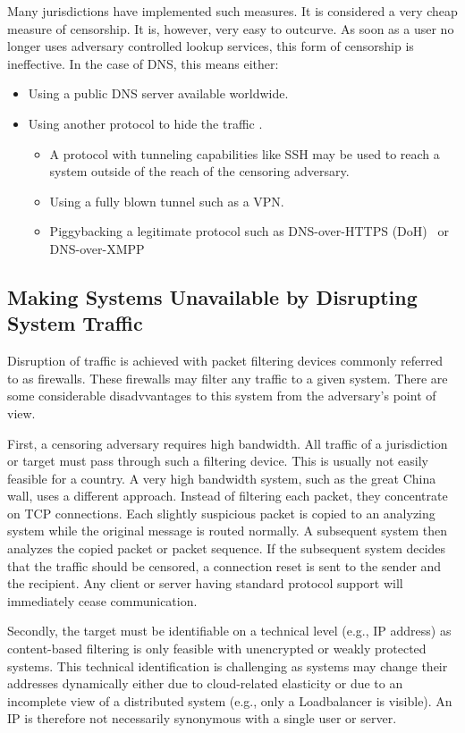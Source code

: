 Many jurisdictions have implemented such measures. It is considered a very cheap measure of censorship. It is, however, very easy to outcurve. As soon as a user no longer uses adversary controlled lookup services, this form of censorship is ineffective. In the case of DNS, this means either: 

\begin{itemize}
	\item Using a public DNS server available worldwide. 
	\item Using another protocol to hide the traffic .
	\begin{itemize}
		\item A protocol with tunneling capabilities like SSH may be used to reach a system outside of the reach of the censoring adversary.
		\item Using a fully blown tunnel such as a VPN.
		\item Piggybacking a legitimate protocol such as DNS-over-HTTPS (DoH)~\cite{rfc8484} or DNS-over-XMPP~\cite{xep0418}
	\end{itemize}
\end{itemize}

\subsection{Making Systems Unavailable by Disrupting System Traffic}
Disruption of traffic is achieved with packet filtering devices commonly referred to as firewalls. These firewalls may filter any traffic to a given system. There are some considerable disadvvantages to this system from the adversary's point of view.

First, a censoring adversary requires high bandwidth. All traffic of a jurisdiction or target must pass through such a filtering device. This is usually not easily feasible for a country. A very high bandwidth system, such as the great China wall, uses a different approach. Instead of filtering each packet, they concentrate on TCP connections. Each slightly suspicious packet is copied to an analyzing system while the original message is routed normally. A subsequent system then analyzes the copied packet or packet sequence. If the subsequent system decides that the traffic should be censored, a connection reset is sent to the sender and the recipient. Any client or server having standard protocol support will immediately cease communication.

Secondly, the target must be identifiable on a technical level (e.g., IP address) as content-based filtering is only feasible with unencrypted or weakly protected systems. This technical identification is challenging as systems may change their addresses dynamically either due to cloud-related elasticity or due to an incomplete view of a distributed system (e.g., only a Loadbalancer is visible). An IP is therefore not necessarily synonymous with a single user or server. 

